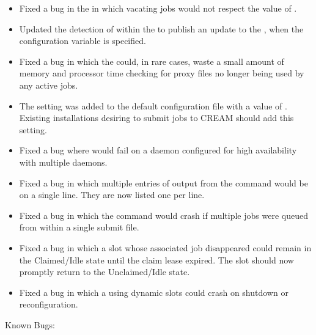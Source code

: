 \begin{itemize}
\item Fixed a bug in the  in which vacating jobs would not 
respect the value of .

\item Updated the detection of  within the 
 to publish an update to the ,
 when the configuration variable  is specified.

\item Fixed a bug in which the  could, in rare cases,
waste a
small amount of memory and processor time checking for proxy files no longer
being used by any active jobs.

\item The setting  was added to the default configuration 
file with a value of .
Existing installations desiring to 
submit jobs to CREAM should add this setting.

\item Fixed a bug where  would fail on a 
daemon configured for high availability with multiple 
daemons.

\item Fixed a bug in which multiple entries of output from 
the command
 
would be on a single line.  They are now listed one per line.

\item Fixed a bug in which the command
  would crash if multiple
jobs were queued from within a single submit file.

\item Fixed a bug in which a slot whose associated job disappeared
could remain in the Claimed/Idle state until the claim lease expired.
The slot should now promptly return to the Unclaimed/Idle state.

\item Fixed a bug in which a  using dynamic slots could
crash on shutdown or reconfiguration.



\end{itemize}

\noindent Known Bugs:

